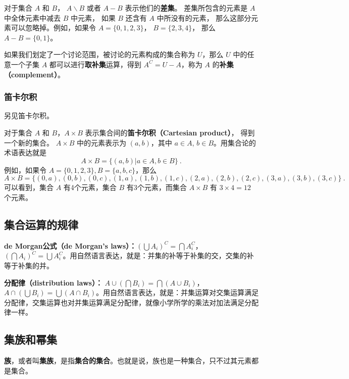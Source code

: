 对于集合 $A$ 和 $B$， $A\backslash B$ 或者 $A-B$ 表示他们的\textbf{差集}。 差集所包含的元素是 $A$ 中全体元素中减去 $B$ 中元素， 如果 $B$ 还含有 $A$ 中所没有的元素， 那么这部分元素可以忽略掉。例如，如果令 $A=\{0,1,2,3\}$， $B=\{2,3,4\}$， 那么 $A-B=\{0,1\}$。

如果我们划定了一个讨论范围，被讨论的元素构成的集合称为 $U$，那么 $U$ 中的任意一个子集 $A$ 都可以进行\textbf{取补集}运算，得到 $A^C=U-A$，称为 $A$ 的\textbf{补集（complement）}。

\subsubsection{笛卡尔积}
另见笛卡尔积。

对于集合 $A$ 和 $B$，$A\times B$ 表示集合间的\textbf{笛卡尔积（Cartesian product）}， 得到一个新的集合。 $A\times B$ 中的元素表示为 $(a,b)$，其中 $a\in A$, $b\in B$。用集合论的术语表达就是
\begin{equation}\label{eq_Set_1}
A\times B=\{(a,b)|a\in A, b\in B\}~.
\end{equation}
例如，如果令 $A=\{0,1,2,3\}, B=\{a, b, c\}$，那么
\begin{equation}
A\times B=\{ (0,a),(0,b),(0,c),(1,a),(1,b),(1,c),(2,a),(2,b),(2,c),(3,a),(3,b),(3,c) \}~.
\end{equation}
可以看到，集合 $A$ 有4个元素，集合 $B$ 有3个元素，而集合 $A\times B$ 有 $3\times4 = 12$ 个元素。

\subsection{集合运算的规律}

\textbf{de Morgan公式（de Morgan's laws）：}$(\bigcup A_i)^C=\bigcap A_i^C$，$(\bigcap A_i)^C=\bigcup A_i^C$。用自然语言表达，就是：并集的补等于补集的交，交集的补等于补集的并。

\textbf{分配律（distribution laws）：} $A\cup(\bigcap B_i)=\bigcap (A\cup B_i)$，$A\cap(\bigcup B_i)=\bigcup (A\cap B_i)$。用自然语言表达，就是：并集运算对交集运算满足分配律，交集运算也对并集运算满足分配律，就像小学所学的乘法对加法满足分配律一样。


\subsection{集族和幂集}

\textbf{族}，或者叫\textbf{集族}，是指\textbf{集合的集合}。也就是说，族也是一种集合，只不过其元素都是集合。

